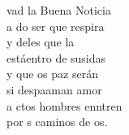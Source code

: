 \documentclass[12pt]{article}
\begin{document}
\begin{multicols*}{2}
\begin{cancion}%
	vad la Buena Noticia\\
	a do ser que respira\\
	y deles que la \\
	estáentro de susidas\\
	y que os paz serán\\
	si despaaman amor\\
	a ctos hombres enntren\\
	por s caminos de os.\\
\end{cancion}%


\end{multicols*}
\end{document}
